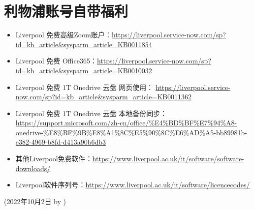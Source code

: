 \section{利物浦账号自带福利}
\label{sec.fuli_liverpool}
\begin{itemize}
    \item Liverpool 免费高级Zoom账户：\url{https://liverpool.service-now.com/sp?id=kb_article&sysparm_article=KB0011854}
    \item Liverpool 免费 Office365：\url{https://liverpool.service-now.com/sp?id=kb_article&sysparm_article=KB0010032}
    \item Liverpool 免费 1T Onedrive 云盘 网页使用： \url{https://liverpool.service-now.com/sp?id=kb_article&sysparm_article=KB0011362}
    \item Liverpool 免费 1T Onedrive 云盘 本地备份同步： \url{https://support.microsoft.com/zh-cn/office/%E4%BD%BF%E7%94%A8-onedrive-%E8%BF%9B%E8%A1%8C%E5%90%8C%E6%AD%A5-bb89981b-e382-4969-b8fd-d413a90b6db3}
    \item 其他Liverpool免费软件：\url{https://www.liverpool.ac.uk/it/software/software-downloads/}
    \item Liverpool软件序列号：\url{https://www.liverpool.ac.uk/it/software/licencecodes/}
\end{itemize}

\begin{flushright}
    (2022年10月2日 by \Wu)
    \end{flushright}